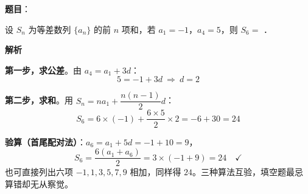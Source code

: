 \begin{answer}

\textbf{题目}：

设 $S_n$ 为等差数列 $\{a_n\}$ 的前 $n$ 项和，若 $a_1=-1$，$a_4=5$，则 $S_6=$ \gkblank{}．

\textbf{解析}

\textbf{第一步，求公差}。由 $a_4=a_1+3d$：
\nopagebreak[4]
\[5=-1+3d\ \Longrightarrow\ d=2\]

\textbf{第二步，求和}。用 $S_n=na_1+\dfrac{n(n-1)}{2}d$：
\nopagebreak[4]
\[S_6=6\times(-1)+\frac{6\times5}{2}\times2=-6+30=24\]

\begin{gktip}
\textbf{验算（首尾配对法）}：$a_6=a_1+5d=-1+10=9$，
\nopagebreak[4]
\[S_6=\frac{6\left(a_1+a_6\right)}{2}=3\times(-1+9)=24\quad\checkmark\]
也可直接列出六项 $-1,1,3,5,7,9$ 相加，同样得 $24$。三种算法互验，填空题最忌算错却无从察觉。
\end{gktip}


\par\medskip

\end{answer}
